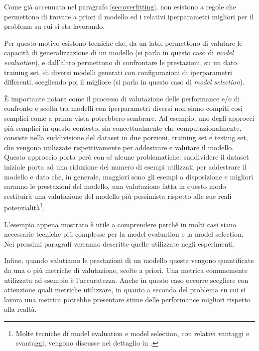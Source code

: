 \documentclass[../../main.tex]{subfiles}
\begin{document}
    Come già accennato nel paragrafo \ref{sec:overfitting}, non esistono a regole che permettono di trovare a priori il modello ed i relativi iperparametri migliori per il problema su cui si sta lavorando.

    Per questo motivo esistono tecniche che, da un lato, permettono di valutare le capacità di generalizzazione di un modello (si parla in questo caso di \textit{model evaluation}), e dall'altro permettono di confrontare le prestazioni, su un dato training set, di diversi modelli generati con configurazioni di iperparametri differenti, scegliendo poi il migliore (si parla in questo caso di \textit{model selection}).
   
    È importante notare come il processo di valutazione delle performance e/o di confronto e scelta tra modelli con iperparametri diversi non siano compiti così semplici come a prima vista potrebbero sembrare. Ad esempio, uno degli approcci più semplici in questo contesto, sia concettualmente che computazionalmente, consiste nella suddivisione del dataset in due porzioni, training set e testing set, che vengono utilizzate rispettivamente per addestrare e valutare il modello.\\
    Questo approccio porta però con sé alcune problematiche: suddividere il dataset iniziale porta ad una riduzione del numero di esempi utilizzati per addestrare il modello e dato che, in generale, maggiori sono gli esempi a disposizione e migliori saranno le prestazioni del modello, una valutazione fatta in questo modo restituirà una valutazione del modello più pessimista rispetto alle sue reali potenzialità\footnote{Molte tecniche di model evaluation e model selection, con relativi vantaggi e svantaggi, vengono discusse nel dettaglio in \cite{raschka2020model}.}.

    L'esempio appena mostrato è utile a comprendere perché in molti casi siano necessarie tecniche più complesse per la model evaluation e la model selection. Nei prossimi paragrafi verranno descritte quelle utilizzate negli esperimenti.

    Infine, quando valutiamo le prestazioni di un modello queste vengono quantificate da una o più metriche di valutazione, scelte a priori. Una metrica comunemente utilizzata ad esempio è l'accuratezza. Anche in questo caso occorre scegliere con attenzione quali metriche utilizzare, in quanto a seconda del problema su cui si lavora una metrica potrebbe presentare stime delle performance migliori rispetto alla realtà.
\end{document}
